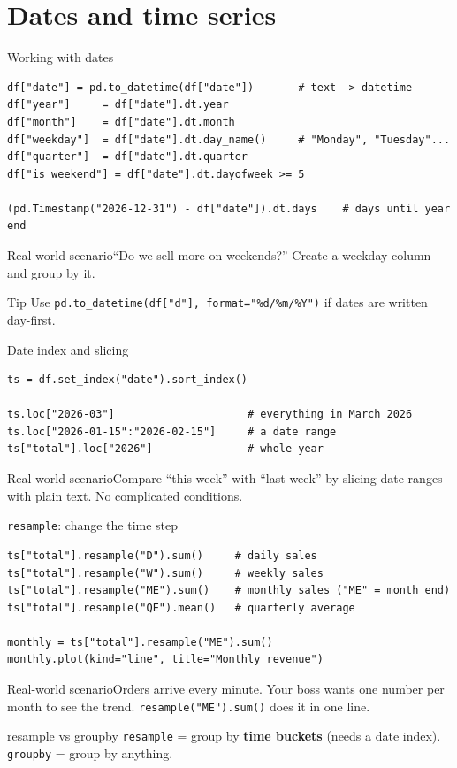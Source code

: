 \documentclass[aspectratio=169,10pt]{beamer}
\newcommand{\code}[1]{\texttt{#1}}
\newcommand{\scenario}[1]{\begin{exampleblock}{Real-world scenario}#1\end{exampleblock}}
\begin{document}
\section{Dates and time series}

\begin{frame}[fragile]{Working with dates}
\begin{lstlisting}
df["date"] = pd.to_datetime(df["date"])       # text -> datetime
df["year"]     = df["date"].dt.year
df["month"]    = df["date"].dt.month
df["weekday"]  = df["date"].dt.day_name()     # "Monday", "Tuesday"...
df["quarter"]  = df["date"].dt.quarter
df["is_weekend"] = df["date"].dt.dayofweek >= 5

(pd.Timestamp("2026-12-31") - df["date"]).dt.days    # days until year end
\end{lstlisting}
  \scenario{``Do we sell more on weekends?'' Create a weekday column and group by it.}
  \begin{block}{Tip}
    Use \code{pd.to\_datetime(df["d"], format="\%d/\%m/\%Y")} if dates are written day-first.
  \end{block}
\end{frame}

\begin{frame}[fragile]{Date index and slicing}
\begin{lstlisting}
ts = df.set_index("date").sort_index()

ts.loc["2026-03"]                     # everything in March 2026
ts.loc["2026-01-15":"2026-02-15"]     # a date range
ts["total"].loc["2026"]               # whole year
\end{lstlisting}
  \scenario{Compare ``this week'' with ``last week'' by slicing date ranges with
  plain text. No complicated conditions.}
\end{frame}

\begin{frame}[fragile]{\texttt{resample}: change the time step}
\begin{lstlisting}
ts["total"].resample("D").sum()     # daily sales
ts["total"].resample("W").sum()     # weekly sales
ts["total"].resample("ME").sum()    # monthly sales ("ME" = month end)
ts["total"].resample("QE").mean()   # quarterly average

monthly = ts["total"].resample("ME").sum()
monthly.plot(kind="line", title="Monthly revenue")
\end{lstlisting}
  \scenario{Orders arrive every minute. Your boss wants one number per month to see the trend.
  \code{resample("ME").sum()} does it in one line.}
  \begin{block}{resample vs groupby}
    \code{resample} = group by \textbf{time buckets} (needs a date index). \code{groupby} =
    group by anything.
  \end{block}
\end{frame}
\end{document}
